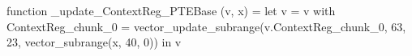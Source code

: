 function _update_ContextReg_PTEBase (v, x) = let v = { v with ContextReg_chunk_0 = vector_update_subrange(v.ContextReg_chunk_0, 63, 23, vector_subrange(x, 40, 0)) } in v
